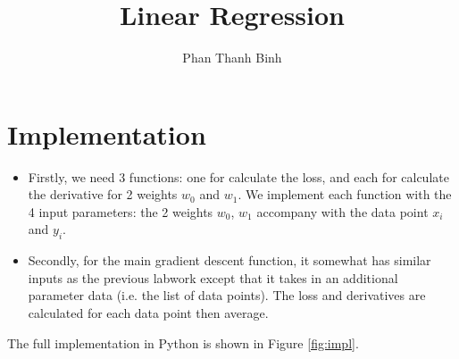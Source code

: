 \documentclass{article}
\title{Linear Regression}
\author{Phan Thanh Binh}
\begin{document}
\maketitle

\section{Implementation}
\begin{itemize}
\item Firstly, we need 3 functions: one for calculate the loss, and each for calculate the derivative for 2 weights $w_0$ and $w_1$.
We implement each function with the 4 input parameters: the 2 weights $w_0$, $w_1$ accompany with the data point $x_i$ and $y_i$.
\item Secondly, for the main gradient descent function, it somewhat has similar inputs as the previous labwork except that it takes in an additional parameter data (i.e. the list of data points). The loss and derivatives are calculated for each data point then average.
\end{itemize}
The full implementation in Python is shown in Figure \ref{fig:impl}.
\end{document}
